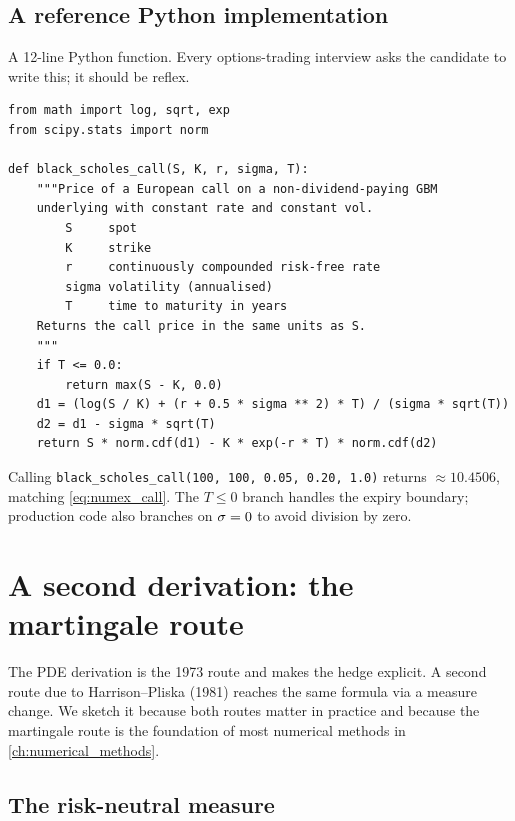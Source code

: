 \subsection{A reference Python implementation}
\label{subsec:ch15_code}

A 12-line Python function. Every options-trading interview asks
the candidate to write this; it should be reflex.

\begin{lstlisting}[caption={Black--Scholes European call price as a pure function. Returns a single float; no side effects, no plotting, no persistence. Exactly the function a Strat would type into a notebook to sanity-check a vendor pricer.}]
from math import log, sqrt, exp
from scipy.stats import norm

def black_scholes_call(S, K, r, sigma, T):
    """Price of a European call on a non-dividend-paying GBM
    underlying with constant rate and constant vol.
        S     spot
        K     strike
        r     continuously compounded risk-free rate
        sigma volatility (annualised)
        T     time to maturity in years
    Returns the call price in the same units as S.
    """
    if T <= 0.0:
        return max(S - K, 0.0)
    d1 = (log(S / K) + (r + 0.5 * sigma ** 2) * T) / (sigma * sqrt(T))
    d2 = d1 - sigma * sqrt(T)
    return S * norm.cdf(d1) - K * exp(-r * T) * norm.cdf(d2)
\end{lstlisting}

Calling \texttt{black\_scholes\_call(100, 100, 0.05, 0.20, 1.0)}
returns $\approx 10.4506$, matching \eqref{eq:numex_call}. The
$T \leq 0$ branch handles the expiry boundary; production code
also branches on $\sigma = 0$ to avoid division by zero.

\section{A second derivation: the martingale route}
\label{sec:ch15_martingale}

The PDE derivation is the 1973 route and makes the hedge
explicit. A second route due to Harrison--Pliska (1981) reaches
the same formula via a measure change. We sketch it because both
routes matter in practice and because the martingale route is
the foundation of most numerical methods in
\cref{ch:numerical_methods}.

\subsection{The risk-neutral measure}
\label{subsec:ch15_riskneutral_measure}

